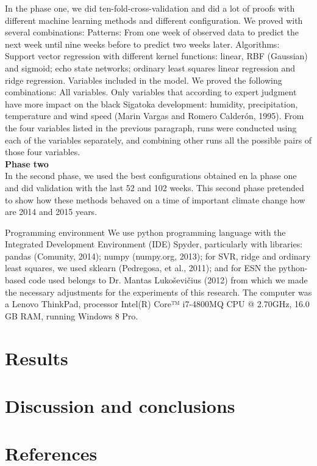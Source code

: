 \documentclass[review]{elsarticle}
\begin{document}
In the phase one, we did ten-fold-cross-validation and did a lot of proofs with different machine learning methods and different configuration. 
We proved with several combinations:
	Patterns: From one week of observed data to predict the next week until nine weeks before to predict two weeks later.
	Algorithms: Support vector regression with different kernel functions: linear, RBF (Gaussian) and sigmoid; echo state networks; ordinary least squares linear regression and ridge regression.
	Variables included in the model. We proved the following combinations:
	All variables.
	Only variables that according to expert judgment have more impact on the black Sigatoka development: humidity, precipitation, temperature and wind speed (Marin Vargas and Romero Calderón, 1995).
	From the four variables listed in the previous paragraph, runs were conducted using each of the variables separately, and combining other runs all the possible pairs of those four variables.\\
{\bf Phase two } \\
In the second phase, we used the best configurations obtained en la phase one and did validation with the last 52 and 102 weeks. 
This second phase pretended to show how these methods behaved on a time of important climate change how are 2014 and 2015 years.

Programming environment
We use python programming language with the Integrated Development Environment (IDE) Spyder, particularly with libraries: pandas (Comunity, 2014); numpy (numpy.org, 2013); for SVR, ridge and ordinary least squares, we used sklearn (Pedregosa, et al., 2011); and for ESN the python-based code used belongs to Dr. Mantas Lukoševičius (2012) from which we made the necessary adjustments for the experiments of this research. The computer was a Lenovo ThinkPad, processor Intel(R) Core™ i7-4800MQ CPU @ 2.70GHz, 16.0 GB RAM, running Windows 8 Pro.






\section{Results}

\section{Discussion and conclusions}

\section{References}
\end{document}
